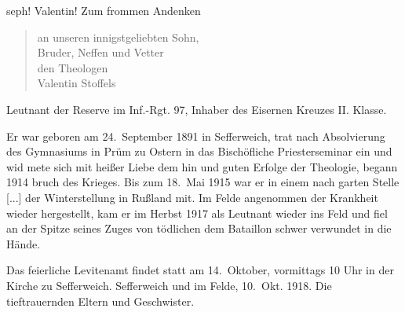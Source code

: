 

%
seph! Valentin!         Zum frommen Andenken

\pend
\begin{verse}
an unseren innigstgeliebten Sohn,\\
Bruder, Neffen und Vetter\\
den Theologen\\
Valentin Stoffels
\end{verse}
\pstart
Leutnant der Reserve im Inf.-Rgt. 97,\ob
Inhaber des Eisernen Kreuzes II. Klasse.

Er war geboren am 24.\ September 1891\ob
in Sefferweich, trat nach Absolvierung des\ob
Gymnasiums in Prüm zu Ostern in das\ob
Bischöfliche Priesterseminar ein und wid\ohb
mete sich mit heißer Liebe dem hin und\unsicher\ob
guten Erfolge der Theologie, begann 1914\ob
bruch des Krieges. Bis zum 18.\ Mai 1915 war er in einem nach\ohb
garten Stelle [...] der Winterstellung in Rußland mit.\ob
Im Felde angenommen der\ob
Krankheit wieder hergestellt, kam er im\ob
Herbst 1917 als Leutnant wieder ins Feld\ob
und fiel an der Spitze seines Zuges von\ob
tödlichen dem Bataillon schwer verwundet\ob
in die Hände.

Das feierliche Levitenamt findet statt\ob
am 14.\ Oktober, vormittags 10 Uhr in der\ob
Kirche zu Sefferweich.\ob
Sefferweich und im Felde, 10.\ Okt. 1918.\ob
Die tieftrauernden Eltern und Geschwister.
\pend

